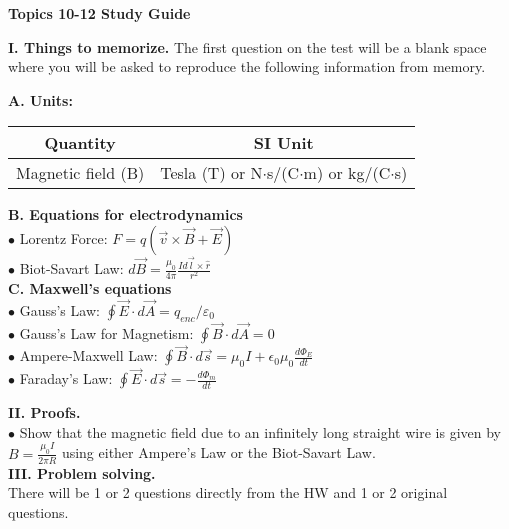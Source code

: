 \documentclass[11pt]{article}
\begin{document}
{\centering
\textbf{Topics 10-12 Study Guide} \par
\vspace{\baselineskip}
}

\textbf{I. Things to memorize.}
The first question on the test will be a blank space where you will be asked to reproduce the following information from memory.
\vspace{0.5\baselineskip}

\begin{addmargin}[1em]{0em}%
\textbf{A. Units:}

\vspace{0.25\baselineskip}
\begin{tabular}{ |c|c| } 
\hline
Quantity & SI Unit \\ 
\hline
Magnetic field (B) & Tesla (T) or N$\cdot$s/(C$\cdot$m) or kg/(C$\cdot$s) \\ 
\hline
\end{tabular}
\vspace{0.75\baselineskip}

\textbf{B. Equations for electrodynamics} \\
$\bullet$ Lorentz Force: $F = q (\vec{v} \times \vec{B} + \vec{E})$ \\
$\bullet$ Biot-Savart Law: $d\vec{B} = \frac{\mu_0}{4\pi} \frac{I d\vec{l} \times \hat{r}}{r^2}$ \\

\textbf{C. Maxwell's equations} \\
$\bullet$ Gauss's Law: $\oint \vec{E} \cdot d\vec{A} = q_{enc}/\varepsilon_0$ \\
$\bullet$ Gauss's Law for Magnetism: $\oint \vec{B} \cdot d\vec{A} = 0$ \\
$\bullet$ Ampere-Maxwell Law: $\oint \vec{B} \cdot d\vec{s} = \mu_0 I + \epsilon_0 \mu_0 \frac{d\Phi_E}{dt}$ \\
$\bullet$ Faraday's Law: $\oint \vec{E} \cdot d\vec{s} = - \frac{d \Phi_m}{dt}$ \\

\end{addmargin}

\vspace{\baselineskip}
\textbf{II. Proofs.} \\
$\bullet$ Show that the magnetic field due to an infinitely long straight wire is given by $B = \frac{\mu_0 I}{2 \pi R}$ using either Ampere's Law or the  Biot-Savart Law. \\

\vspace{\baselineskip}
\textbf{III. Problem solving.} \\
There will be 1 or 2 questions directly from the HW and 1 or 2 original questions.
\end{document}

